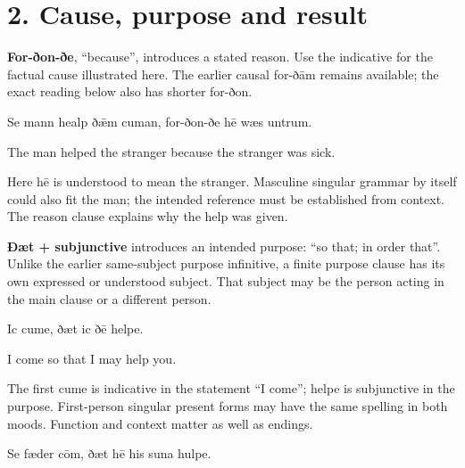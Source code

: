\section*{2. Cause, purpose and result}

\textbf{For-ðon-ðe}, “because”, introduces a stated reason. Use the indicative for the factual cause illustrated here. The earlier causal for-ðām remains available; the exact reading below also has shorter for-ðon.

Se mann healp ðǣm cuman, for-ðon-ðe hē wæs untrum.

The man helped the stranger because the stranger was sick.

Here hē is understood to mean the stranger. Masculine singular grammar by itself could also fit the man; the intended reference must be established from context. The reason clause explains why the help was given.

\textbf{Ðæt + subjunctive} introduces an intended purpose: “so that; in order that”. Unlike the earlier same-subject purpose infinitive, a finite purpose clause has its own expressed or understood subject. That subject may be the person acting in the main clause or a different person.

Ic cume, ðæt ic ðē helpe.

I come so that I may help you.

The first cume is indicative in the statement “I come”; helpe is subjunctive in the purpose. First-person singular present forms may have the same spelling in both moods. Function and context matter as well as endings.

Se fæder cōm, ðæt hē his suna hulpe.

